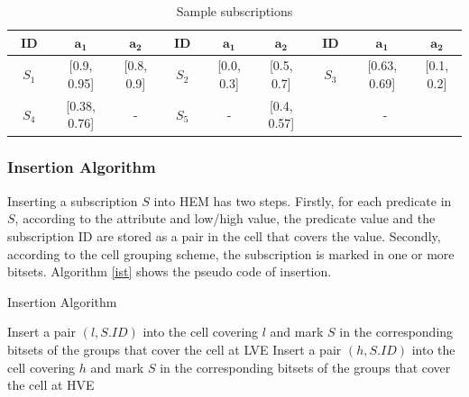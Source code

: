\documentclass[runningheads]{llncs}
\begin{document}
\begin{table}[tbp]
\caption{Sample subscriptions}
\centering
\begin{tabular}{|c|c|c||c|c|c||c|c|c|}
\hline
~\textbf{ID}~ & {$\mathbf{a_1}$} & \textbf{$\mathbf{a_2}$} & ~\textbf{ID}~ & \textbf{$\mathbf{a_1}$} & \textbf{$\mathbf{a_2}$} & ~\textbf{ID}~ & \textbf{$\mathbf{a_1}$} & \textbf{$\mathbf{a_2}$}   \\ \hline
$S_1$ & [0.9, 0.95] & [0.8, 0.9] & $S_2$ & [0.0, 0.3] & [0.5, 0.7] & $S_3$ & [0.63, 0.69] & [0.1, 0.2] \\ \hline 
$S_4$ & [0.38, 0.76] & - & $S_5$ &  - & [0.4, 0.57] & \multicolumn{3}{c|}{-} \\ \hline
\end{tabular}
\label{sss}
\end{table}

\subsubsection{Insertion Algorithm}

Inserting a subscription $S$ into HEM has two steps. Firstly, for each predicate in $S$, according to the attribute and low/high value, the predicate value and the subscription ID are stored as a pair in the cell that covers the value. Secondly, according to the cell grouping scheme, the subscription is marked in one or more bitsets. Algorithm \ref{ist} shows the pseudo code of insertion.

\begin{algorithm}[tbp]
  \caption{Insertion Algorithm} 
  \label{ist}
    { 
        Insert a pair $(l, S.ID)$ into the cell covering $l$ and mark $S$ in the corresponding bitsets of the groups that cover the cell at LVE\;
        Insert a pair $(h, S.ID)$ into the cell covering $h$ and mark $S$ in the corresponding bitsets of the groups that cover the cell at HVE\;
    } 
\end{algorithm}
\end{document}
